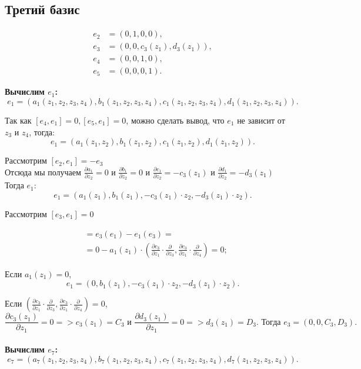\documentclass[12pt]{article}
\begin{document}
\subsection{Третий базис} 
\begin{align*}
e_2 &= (0,1,0,0), \\
e_3 &= (0,0,c_3(z_1),d_3(z_1)), \\
e_4 &= (0,0,1,0), \\
e_5 &= (0,0,0,1). 
\end{align*}

\textbf{Вычислим $e_1$:}
$$e_1 = (a_1(z_1,z_2,z_3,z_4), b_1(z_1,z_2,z_3,z_4), c_1(z_1,z_2,z_3,z_4), d_1(z_1,z_2,z_3,z_4)).$$

Так как $[e_4,e_1] = 0, [e_5,e_1] = 0$, можно сделать вывод, что $e_1$ не зависит от $z_3 \text{ и } z_4$, тогда: 
$$e_1 = (a_1(z_1,z_2), b_1(z_1,z_2), c_1(z_1,z_2), d_1(z_1,z_2)).$$ 

Рассмотрим $[e_2,e_1] = -e_3$ \\

Отсюда мы получаем $\frac{\partial a_1 }{\partial z_2} = 0 \text{ и } \frac{\partial b_1 }{\partial z_2} = 0 \text{ и } \frac{\partial c_1 }{\partial z_2} = -c_3(z_1) \text{ и } \frac{\partial d_1 }{\partial z_2} = -d_3(z_1)$\\

Тогда $e_1$:
$$e_1 = (a_1(z_1), b_1(z_1), -c_3(z_1) \cdot  z_2, -d_3(z_1)\cdot  z_2).$$

Рассмотрим $[e_3,e_1] = 0$

\begin{align*}
[e_3,e_1] &= e_3(e_1) - e_1(e_3) = \\
&= 0 - a_1(z_1) \cdot \left(
\frac{\partial c_3}{\partial z_1} \cdot \frac{\partial}{\partial z_3}, 
\frac{\partial c_3}{\partial z_1} \cdot \frac{\partial}{\partial z_4}
\right) = 0;
\end{align*}

Если $a_1(z_1) = 0$,   $$e_1 = (0, b_1(z_1), -c_3(z_1) \cdot  z_2, -d_3(z_1)\cdot  z_2).$$

Если $\left(
\frac{\partial c_3}{\partial z_1} \cdot \frac{\partial}{\partial z_3}, 
\frac{\partial c_3}{\partial z_1} \cdot \frac{\partial}{\partial z_4}
\right) = 0$,   $$ \frac{\partial c_3(z_1)}{\partial z_1} = 0 => c_3(z_1)=C_3 \text{ и } \frac{\partial d_3(z_1)}{\partial z_1} = 0 => d_3(z_1)=D_3. \text{ Тогда } e_3 = (0, 0, C_3 , D_3). $$ 
\\

\textbf{Вычислим $e_7$:}
$$e_7 = (a_7(z_1,z_2,z_3,z_4), b_7(z_1,z_2,z_3,z_4), c_7(z_1,z_2,z_3,z_4), d_7(z_1,z_2,z_3,z_4)).$$
\end{document}
